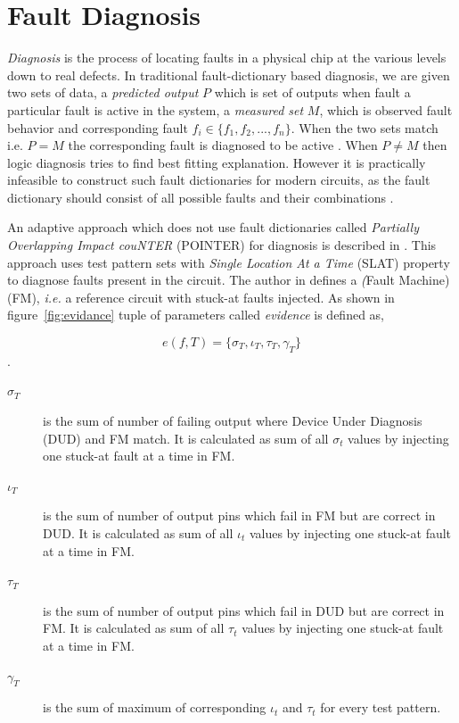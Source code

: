 \section{Fault Diagnosis}
\label{sec:secfd}
\emph{Diagnosis} is the process of locating faults in a physical chip at the various levels down to real defects. In traditional fault-dictionary based diagnosis, we are given two sets of data, a \emph{predicted output} $P$ which is set of outputs when fault a particular fault is active in the system, a \emph{measured set} $M$, which is observed fault behavior and corresponding fault $ f_i \in \{f_1,f_2,...,f_n\} $. When the two sets match i.e. $P = M$ the corresponding fault is diagnosed to be active . When $P \neq M$ then logic diagnosis tries to find best fitting explanation. However it is practically infeasible to construct such fault dictionaries for modern circuits, as the fault dictionary should consist of all possible faults and their combinations \cite{Wang2010}. 

An adaptive approach which does not use fault dictionaries called \emph{Partially Overlapping Impact couNTER} (POINTER) for diagnosis is described in \cite{Holst2009}. This approach uses test pattern sets with \emph{Single Location At a Time} (SLAT) property \cite{Bartenstein2001} to diagnose faults present in the circuit. The author in \cite{Holst2009} defines a \emph(Fault Machine) (FM), \emph{i.e.} a reference circuit with stuck-at faults injected. As shown in figure~\ref{fig:evidance} tuple of parameters called \emph{evidence} is defined as,

\[e(f,T) = \{\sigma_T, \iota_T, \tau_T, \gamma_T\}\]. 

\begin{description}
	\item[$\sigma_T$] is the sum of number of failing output  where Device Under Diagnosis (DUD) and FM match. It is calculated as sum of all $\sigma_t$ values by injecting one stuck-at fault at a time in FM.
	\item[$\iota_T$] is the sum of number of output pins which fail in FM but are correct in DUD. It is calculated as sum of all $\iota_t$ values by injecting one stuck-at fault at a time in FM.
	\item[$\tau_T$] is the sum of number of output pins which fail in DUD but are correct in FM. It is calculated as sum of all $\tau_t$ values by injecting one stuck-at fault at a time in FM.
 	\item[$\gamma_T$] is the sum of maximum of corresponding $\iota_t $ and $\tau_t$ for every test pattern.
\end{description}

